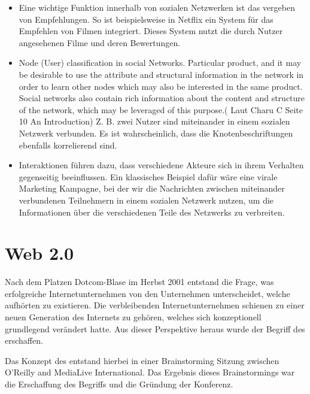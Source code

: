 \begin{itemize}
\item Eine wichtige Funktion innerhalb von sozialen Netzwerken ist das vergeben von Empfehlungen. So ist beispielsweise in Netflix ein System für das Empfehlen von Filmen integriert. Dieses System nutzt die durch Nutzer angesehenen Filme und deren Bewertungen.
\item Node (User) classification in social Networks. Particular product, and it may be desirable to use the attribute and structural information in the network in order to learn other nodes which may also be interested in the same product. Social networks also contain rich information about the content and structure of the network, which may be leveraged of this purpose.( Laut Charu C Seite 10 An Introduction) Z. B. zwei Nutzer sind miteinander in einem sozialen Netzwerk verbunden. Es ist wahrscheinlich, dass die Knotenbeschriftungen ebenfalls korrelierend sind.
\item Interaktionen führen dazu, dass verschiedene Akteure sich in ihrem Verhalten gegenseitig beeinflussen. Ein klassisches Beispiel dafür wäre eine virale Marketing Kampagne, bei der wir die Nachrichten zwischen miteinander verbundenen Teilnehmern in einem sozialen Netzwerk nutzen, um die Informationen über die verschiedenen Teile des Netzwerks zu verbreiten.
\end{itemize}


\section{Web 2.0}

Nach dem Platzen Dotcom-Blase im Herbst 2001 entstand die Frage, was erfolgreiche Internetunternehmen von den Unternehmen unterscheidet, welche aufhörten zu existieren. Die verbleibenden Internetunternehmen schienen zu einer neuen Generation des Internets zu gehören, welches sich konzeptionell grundlegend verändert hatte. Aus dieser Perspektive heraus wurde der Begriff des  erschaffen.\\
\parencite{oreilly:web20}

Das Konzept des  entstand hierbei in einer Brainstorming Sitzung zwischen O'Reilly and MediaLive International. Das Ergebnis dieses Brainstormings war die Erschaffung des Begriffs  und die Gründung der  Konferenz.\\
\parencite{oreilly:web20}

